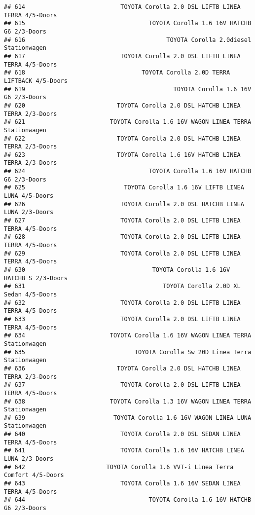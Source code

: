 \documentclass[]{article}
\begin{document}
\begin{verbatim}
## 614                           TOYOTA Corolla 2.0 DSL LIFTB LINEA TERRA 4/5-Doors
## 615                                   TOYOTA Corolla 1.6 16V HATCHB G6 2/3-Doors
## 616                                        TOYOTA Corolla 2.0diesel Stationwagen
## 617                           TOYOTA Corolla 2.0 DSL LIFTB LINEA TERRA 4/5-Doors
## 618                                 TOYOTA Corolla 2.0D TERRA LIFTBACK 4/5-Doors
## 619                                          TOYOTA Corolla 1.6 16V G6 2/3-Doors
## 620                          TOYOTA Corolla 2.0 DSL HATCHB LINEA TERRA 2/3-Doors
## 621                        TOYOTA Corolla 1.6 16V WAGON LINEA TERRA Stationwagen
## 622                          TOYOTA Corolla 2.0 DSL HATCHB LINEA TERRA 2/3-Doors
## 623                          TOYOTA Corolla 1.6 16V HATCHB LINEA TERRA 2/3-Doors
## 624                                   TOYOTA Corolla 1.6 16V HATCHB G6 2/3-Doors
## 625                            TOYOTA Corolla 1.6 16V LIFTB LINEA LUNA 4/5-Doors
## 626                           TOYOTA Corolla 2.0 DSL HATCHB LINEA LUNA 2/3-Doors
## 627                           TOYOTA Corolla 2.0 DSL LIFTB LINEA TERRA 4/5-Doors
## 628                           TOYOTA Corolla 2.0 DSL LIFTB LINEA TERRA 4/5-Doors
## 629                           TOYOTA Corolla 2.0 DSL LIFTB LINEA TERRA 4/5-Doors
## 630                                    TOYOTA Corolla 1.6 16V HATCHB S 2/3-Doors
## 631                                       TOYOTA Corolla 2.0D XL Sedan 4/5-Doors
## 632                           TOYOTA Corolla 2.0 DSL LIFTB LINEA TERRA 4/5-Doors
## 633                           TOYOTA Corolla 2.0 DSL LIFTB LINEA TERRA 4/5-Doors
## 634                        TOYOTA Corolla 1.6 16V WAGON LINEA TERRA Stationwagen
## 635                               TOYOTA Corolla Sw 20D Linea Terra Stationwagen
## 636                          TOYOTA Corolla 2.0 DSL HATCHB LINEA TERRA 2/3-Doors
## 637                           TOYOTA Corolla 2.0 DSL LIFTB LINEA TERRA 4/5-Doors
## 638                        TOYOTA Corolla 1.3 16V WAGON LINEA TERRA Stationwagen
## 639                         TOYOTA Corolla 1.6 16V WAGON LINEA LUNA Stationwagen
## 640                           TOYOTA Corolla 2.0 DSL SEDAN LINEA TERRA 4/5-Doors
## 641                           TOYOTA Corolla 1.6 16V HATCHB LINEA LUNA 2/3-Doors
## 642                       TOYOTA Corolla 1.6 VVT-i Linea Terra Comfort 4/5-Doors
## 643                           TOYOTA Corolla 1.6 16V SEDAN LINEA TERRA 4/5-Doors
## 644                                   TOYOTA Corolla 1.6 16V HATCHB G6 2/3-Doors

\end{verbatim}
\end{document}
